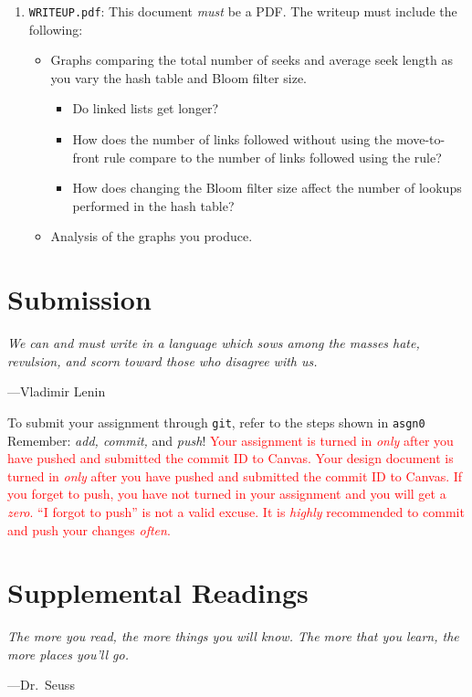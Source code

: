\documentclass{article}
\begin{document}
\begin{enumerate}
  \item \texttt{WRITEUP.pdf}: This document \emph{must} be a PDF. The
    writeup must include the following:
    \begin{itemize}
      \item Graphs comparing the total number of seeks and average seek
        length as you vary the hash table and Bloom filter size.
        \begin{itemize}
          \item Do linked lists get longer?
          \item How does the number of links followed without using the
            move-to-front rule compare to the number of links followed
            using the rule?
          \item How does changing the Bloom filter size affect the
            number of lookups performed in the hash table?
        \end{itemize}
      \item Analysis of the graphs you produce.
    \end{itemize}
\end{enumerate}


\section{Submission}

\epigraph{\emph{We can and must write in a language which sows among the
masses hate, revulsion, and scorn toward those who disagree with
us.}}{---Vladimir Lenin}

\noindent To submit your assignment through \texttt{git}, refer to the
steps shown in \texttt{asgn0} Remember: \emph{add, commit,} and
\emph{push}! \textcolor{red}{Your assignment is turned in \emph{only}
  after you have pushed and submitted the commit ID to Canvas. Your
  design document is turned in \emph{only} after you have pushed and
  submitted the commit ID to Canvas. If you forget to push, you have
  not turned in your assignment and you will get a \emph{zero}. ``I
forgot to push'' is not a valid excuse. It is \emph{highly} recommended
to commit and push your changes \emph{often}.}

\section{Supplemental Readings}

\epigraph{\emph{The more you read, the more things you will know. The
more that you learn, the more places you'll go.}}{---Dr.\ Seuss}\noindent
\end{document}
